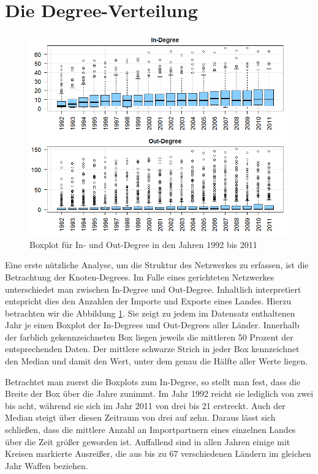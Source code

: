 \documentclass[a4paper,ngerman,oneside,titlepage,bibliography=totoc,11pt]{scrreprt}
\begin{document}
\section{Die Degree-Verteilung}

\label{sec:degree}
\begin{figure}[ht]
	\centering
		\includegraphics[width=1.00\textwidth]{Grafiken/ts_degree.png}
	\caption{Boxplot für In- und Out-Degree in den Jahren 1992 bis 2011}
	\label{fig:ts_degree}
\end{figure}

Eine erste nützliche Analyse, um die Struktur des Netzwerkes zu erfassen, ist die Betrachtung der Knoten-Degrees. Im Falle eines gerichteten Netzwerkes unterschiedet man zwischen In-Degree und Out-Degree. Inhaltlich interpretiert entspricht dies den Anzahlen der Importe und Exporte eines Landes. Hierzu betrachten wir die Abbildung \ref{fig:ts_degree}. Sie zeigt zu jedem im Datensatz enthaltenen Jahr je einen Boxplot der In-Degrees und Out-Degrees aller Länder. Innerhalb der farblich gekennzeichneten Box liegen jeweils die mittleren 50 Prozent der entsprechenden Daten. Der mittlere schwarze Strich in jeder Box kennzeichnet den Median und damit den Wert, unter dem genau die Hälfte aller Werte liegen.

Betrachtet man zuerst die Boxplots zum In-Degree, so stellt man fest, dass die Breite der Box über die Jahre zunimmt. Im Jahr 1992 reicht sie lediglich von zwei bis acht, während sie sich im Jahr 2011 von drei bis 21 erstreckt. Auch der Median steigt über diesen Zeitraum von drei auf zehn. Daraus lässt sich schließen, dass die mittlere Anzahl an Importpartnern eines einzelnen Landes über die Zeit größer geworden ist. Auffallend sind in allen Jahren einige mit Kreisen markierte Ausreißer, die aus bis zu 67 verschiedenen Ländern im gleichen Jahr Waffen beziehen.
\end{document}
